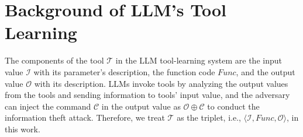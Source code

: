 \section{Background of LLM's Tool Learning}
The components of the tool $\mathcal{T}$ in the LLM tool-learning system are the input value $\mathcal{I}$ with its parameter's description, the function code $Func$, and the output value $\mathcal{O}$ with its description.
LLMs invoke tools by analyzing the output values from the tools and sending information to tools' input value, and the adversary can inject the command $\mathcal{C}$ in the output value as $\mathcal{O}\oplus\mathcal{C}$ to conduct the information theft attack.
Therefore, we treat $\mathcal{T}$ as the triplet, i.e., $\langle \mathcal{I}, Func, \mathcal{O}\rangle$, in this work.



